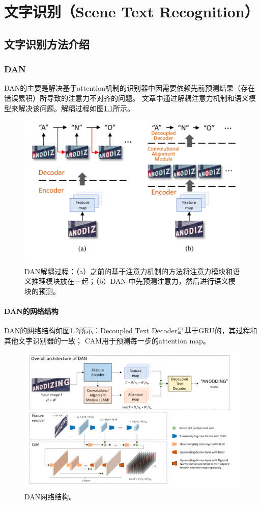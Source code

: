 \chapter{文字识别（Scene Text Recognition）}
\cite{scatter,2020srn,wan2019textscanner}
\section{文字识别方法介绍}
\subsection{DAN}
DAN\cite{wang2019decoupled}的主要是解决基于attention机制的识别器中因需要依赖先前预测结果（存在错误累积）所导致的注意力不对齐的问题。
文章中通过解耦注意力机制和语义模型来解决该问题。解耦过程如图\ref{dan_introduction}所示。
\begin{figure}[H]
    \centering
    \includegraphics[width=.7\textwidth]{figure/recognition/dan_introduction.png} 
    \caption{DAN解耦过程：（a）之前的基于注意力机制的方法将注意力模块和语义推理模块放在一起；（b）DAN
    中先预测注意力，然后进行语义模块的预测。} 
    \label{dan_introduction} 
\end{figure}

\subsubsection{DAN的网络结构}
DAN的网络结构如图\ref{dan_framework}所示：Decoupled Text Decoder是基于GRU的，其过程和其他文字识别器的一致；
CAM用于预测每一步的attention map。
\begin{figure}[H]
    \centering
    \includegraphics[width=.9\textwidth]{figure/recognition/dan_framework.png} 
    \caption{DAN网络结构。} 
    \label{dan_framework} 
\end{figure}

